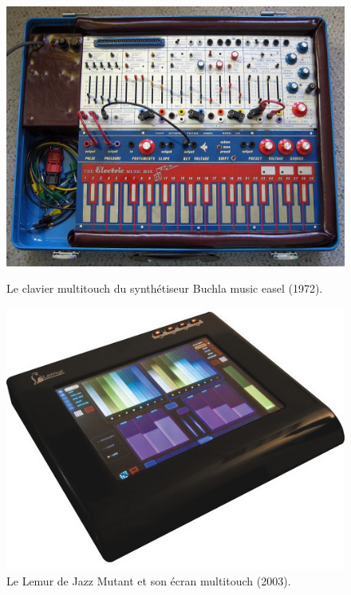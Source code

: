 \begin{figure}[!htbp]
	\captionsetup{format=plain}%
	\centering
	\begin{minipage}[t]{0.48\textwidth}
		\includegraphics[width=\linewidth]{gfx/06_visual_representation/Buchla_music_easel.jpg}
		\caption[Le clavier multitouch du synthétiseur Buchla music easel]{Le clavier multitouch du synthétiseur Buchla music easel (1972).}
		\label{fig:visual_representation:buchla}
	\end{minipage}
	\hspace{.02\linewidth}
	\begin{minipage}[t]{0.48\textwidth}
	    \includegraphics[width=\linewidth]{gfx/06_visual_representation/Lemur.jpg}
		\caption[Le Lemur de Jazz Mutant et son écran multitouch]{Le Lemur de Jazz Mutant et son écran multitouch (2003).}
		\label{fig:visual_representation:lemur}
	\end{minipage}
\end{figure}

